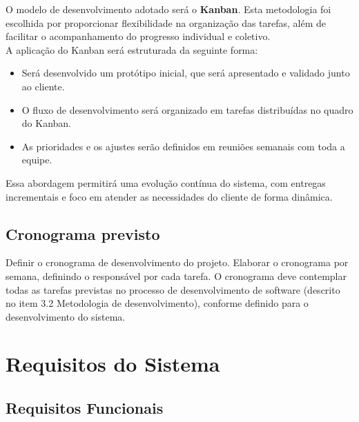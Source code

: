 \documentclass[a4paper,12pt]{article}
\begin{document}
O modelo de desenvolvimento adotado será o \textbf{Kanban}. Esta metodologia foi escolhida por proporcionar flexibilidade na organização das tarefas, além de facilitar o acompanhamento do progresso individual e coletivo.\\

A aplicação do Kanban será estruturada da seguinte forma:

\begin{itemize}
    \item Será desenvolvido um protótipo inicial, que será apresentado e validado junto ao cliente.
    \item O fluxo de desenvolvimento será organizado em tarefas distribuídas no quadro do Kanban.
    \item As prioridades e os ajustes serão definidos em reuniões semanais com toda a equipe.
\end{itemize}

Essa abordagem permitirá uma evolução contínua do sistema, com entregas incrementais e foco em atender as necessidades do cliente de forma dinâmica.


\subsection{Cronograma previsto}
Definir o cronograma de desenvolvimento do projeto. Elaborar o cronograma por semana, definindo o responsável por cada tarefa. O cronograma deve contemplar todas as tarefas previstas no processo de desenvolvimento de software (descrito no item 3.2 Metodologia de desenvolvimento), conforme definido para o desenvolvimento do sistema.

\newpage
\section{Requisitos do Sistema}

\subsection{Requisitos Funcionais}
\end{document}
